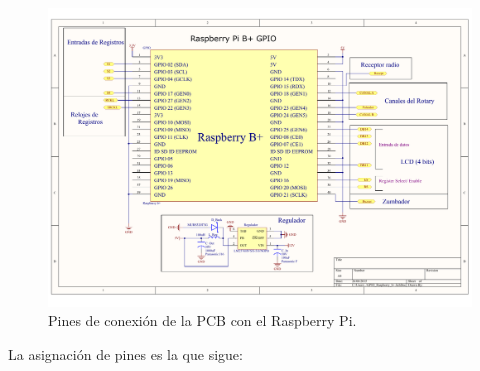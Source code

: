 \begin{figure}[H]
	\noindent \begin{centering}
		\includegraphics[width=\linewidth]{capitulo3/pcb_gpio}
		\par\end{centering}
	\smallskip
	\caption{\label{fig:pcb_gpio} Pines de conexión de la PCB con el Raspberry Pi.}
\end{figure}

\smallskip

La asignación de pines es la que sigue:

